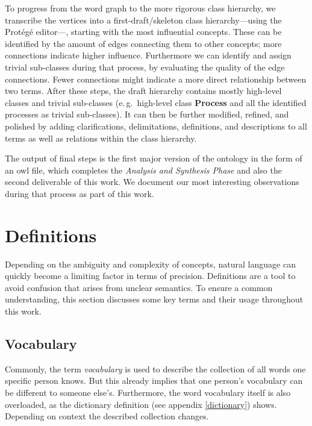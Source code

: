 \documentclass[a4paper, DIV=13, BCOR=0cm]{scrbook}
\newcommand{\eg}{e.\,g.\ }
\begin{document}
To progress from the word graph to the more rigorous class hierarchy, we transcribe the vertices into a first-draft/skeleton class hierarchy---using the Protégé editor---, starting with the most influential concepts. These can be identified by the amount of edges connecting them to other concepts; more connections indicate higher influence. Furthermore we can identify and assign trivial sub-classes during that process, by evaluating the quality of the edge connections. Fewer connections might indicate a more direct relationship between two terms. After these steps, the draft hierarchy contains mostly high-level classes and trivial sub-classes (\eg high-level class \textbf{Process} and all the identified processes as trivial sub-classes). It can then be further modified, refined, and polished by adding clarifications, delimitations, definitions, and descriptions to all terms as well as relations within the class hierarchy.

The output of final steps is the first major version of the ontology in the form of an \gls{owl} file, which completes the \textit{Analysis and Synthesis Phase} and also the second deliverable of this work. We document our most interesting observations during that process as part of this work.

\section{Definitions }
Depending on the ambiguity and complexity of concepts, natural language can quickly become a limiting factor in terms of precision. Definitions are a tool to avoid confusion that arises from unclear semantics. To ensure a common understanding, this section discusses some key terms and their usage throughout this work.

\subsection{Vocabulary }
Commonly, the term \textit{vocabulary} is used to describe the collection of all words one specific person knows. But this already implies that one person's vocabulary can be different to someone else's. Furthermore, the word vocabulary itself is also overloaded, as the dictionary definition (see appendix \ref{dictionary}) shows. Depending on context the described collection changes. \cite{mw-vocabulary}
\end{document}
